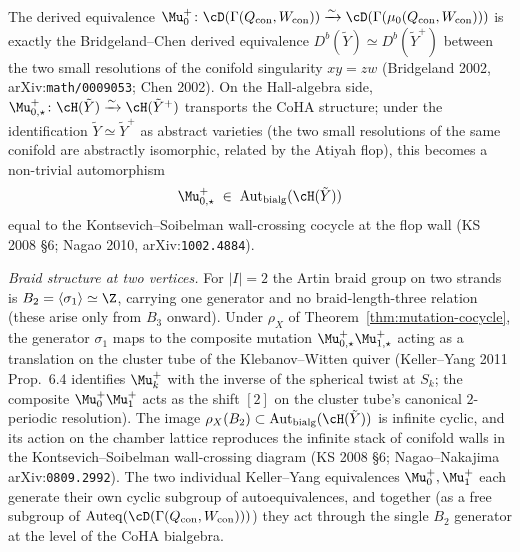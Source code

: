 \begin{example}
The derived equivalence $\Mu_0^{+} \colon \cD(\Gamma(Q_{\mathrm{con}},
W_{\mathrm{con}})) \xrightarrow{\sim} \cD(\Gamma(\mu_0(Q_{\mathrm{con}},
W_{\mathrm{con}})))$ is exactly the Bridgeland--Chen derived equivalence
$D^b(\tilde Y) \simeq D^b(\tilde Y^{+})$ between the two small resolutions
of the conifold singularity $xy = zw$ (Bridgeland 2002, arXiv:\texttt{math/0009053};
Chen 2002). On the Hall-algebra side, $\Mu_{0,\star}^{+} \colon
\cH(\tilde Y) \xrightarrow{\sim} \cH(\tilde Y^{+})$ transports the CoHA
structure; under the identification $\tilde Y \simeq \tilde Y^{+}$ as
abstract varieties (the two small resolutions of the same conifold are
abstractly isomorphic, related by the Atiyah flop), this becomes a
non-trivial automorphism
\[
 \Mu_{0,\star}^{+} \;\in\; \mathrm{Aut}_{\mathrm{bialg}}(\cH(\tilde Y))
\]
equal to the Kontsevich--Soibelman wall-crossing cocycle at the flop wall
(KS 2008 \S6; Nagao 2010, arXiv:\texttt{1002.4884}).

\emph{Braid structure at two vertices.} For $|I| = 2$ the Artin
braid group on two strands is
$B_2 = \langle \sigma_1 \rangle \simeq \Z$, carrying one generator and no
braid-length-three relation (these arise only from $B_3$ onward). Under
$\rho_X$ of Theorem~\ref{thm:mutation-cocycle}, the generator
$\sigma_1$ maps to the composite mutation $\Mu_{0,\star}^{+} \Mu_{1,\star}^{+}$
acting as a translation on the cluster tube of the Klebanov--Witten quiver
(Keller--Yang 2011 Prop.~6.4 identifies $\Mu_k^{+}$ with the inverse of the
spherical twist at $S_k$; the composite $\Mu_0^{+} \Mu_1^{+}$ acts as the
shift $[2]$ on the cluster tube's canonical $2$-periodic resolution). The
image $\rho_X(B_2) \subset \mathrm{Aut}_{\mathrm{bialg}}(\cH(\tilde Y))$ is
infinite cyclic, and its action on the chamber lattice reproduces the
infinite stack of conifold walls in the Kontsevich--Soibelman wall-crossing
diagram (KS 2008 \S6; Nagao--Nakajima arXiv:\texttt{0809.2992}). The two
individual Keller--Yang equivalences $\Mu_0^{+}, \Mu_1^{+}$ each generate
their own cyclic subgroup of autoequivalences, and together (as a free
subgroup of $\mathrm{Auteq}(\cD(\Gamma(Q_{\mathrm{con}}, W_{\mathrm{con}})))$)
they act through the single $B_2$ generator at the level of the CoHA
bialgebra.
\end{example}

